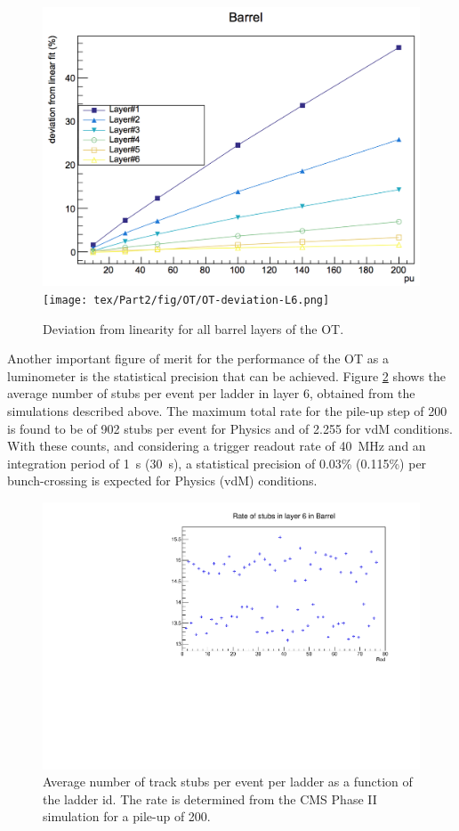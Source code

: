 \begin{figure}[h!]
\centering
\includegraphics[width=.48\linewidth]{tex/Part2/fig/OT/OT-deviation.png}
\texttt{[image: tex/Part2/fig/OT/OT-deviation-L6.png]}
\caption{
 Deviation from linearity for all barrel layers of the OT. 
}
\label{fig:OT_deviation}
\end{figure}

Another important figure of merit for the performance of the OT as a luminometer is the statistical precision that can be achieved. Figure \ref{fig:OT_rates} shows the average number of stubs per event per ladder in layer 6, obtained from the simulations described above. The maximum total rate for the pile-up step of 200 is found to be of 902 stubs per event for Physics and of 2.255 for vdM conditions. With these counts, and considering a trigger readout rate of 40~MHz and an integration period of 1~s (30~s), a statistical precision of 0.03\% (0.115\%) per bunch-crossing is expected for Physics (vdM) conditions.   

\begin{figure}[h!]
\centering
\includegraphics[width=.6\linewidth]{tex/Part2/fig/OT/OT-Rates.pdf}
\caption{
  Average number of track stubs per event per ladder as a function of the ladder id.
  The rate is determined from the CMS Phase II simulation for a pile-up of 200. 
}
\label{fig:OT_rates}
\end{figure}

